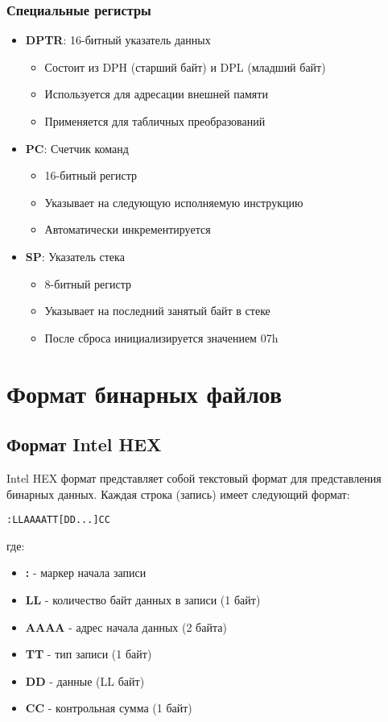 \documentclass[a4paper, 12pt]{article}
\begin{document}
\subsubsection{Специальные регистры}
\begin{itemize}
    \item \textbf{DPTR}: 16-битный указатель данных
    \begin{itemize}
        \item Состоит из DPH (старший байт) и DPL (младший байт)
        \item Используется для адресации внешней памяти
        \item Применяется для табличных преобразований
    \end{itemize}
    \item \textbf{PC}: Счетчик команд
    \begin{itemize}
        \item 16-битный регистр
        \item Указывает на следующую исполняемую инструкцию
        \item Автоматически инкрементируется
    \end{itemize}
    \item \textbf{SP}: Указатель стека
    \begin{itemize}
        \item 8-битный регистр
        \item Указывает на последний занятый байт в стеке
        \item После сброса инициализируется значением 07h
    \end{itemize}
\end{itemize}

\section{Формат бинарных файлов}
\subsection{Формат Intel HEX}
Intel HEX формат представляет собой текстовый формат для представления бинарных данных. Каждая строка (запись) имеет следующий формат:

\begin{verbatim}
:LLAAAATT[DD...]CC
\end{verbatim}

где:
\begin{itemize}
    \item \textbf{:} - маркер начала записи
    \item \textbf{LL} - количество байт данных в записи (1 байт)
    \item \textbf{AAAA} - адрес начала данных (2 байта)
    \item \textbf{TT} - тип записи (1 байт)
    \item \textbf{DD} - данные (LL байт)
    \item \textbf{CC} - контрольная сумма (1 байт)
\end{itemize}
\end{document}
